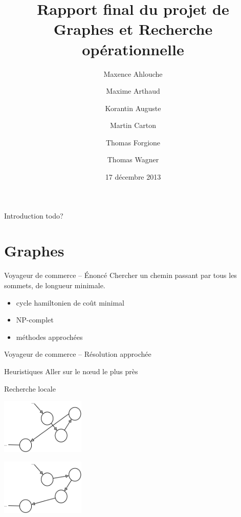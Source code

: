 \documentclass{beamer}
\title[Rapport final de GRO]
      {Rapport final du projet de\\Graphes et Recherche opérationnelle}
\institute{Enseeiht}
\author
  [Ahlouche \and Arthaud \and Auguste
    \and Carton \and Forgione \and Wagner]
  {Maxence Ahlouche \and Maxime Arthaud \and Korantin Auguste
    \and Martin Carton \and Thomas Forgione \and Thomas Wagner}
\date{17 décembre 2013}
\begin{document}
\begin{frame}
  \titlepage
\end{frame}

\begin{frame}{Introduction}
  todo?
\end{frame}

\section{Graphes}

\begin{frame}{Voyageur de commerce -- Énoncé}
    Chercher un chemin passant par tous les sommets, de longueur minimale.
    \begin{itemize}
        \item cycle hamiltonien de coût minimal
        \item NP-complet
        \item méthodes approchées
    \end{itemize}
\end{frame}

\begin{frame}{Voyageur de commerce -- Résolution approchée}
    \begin{block}{Heuristiques}
        Aller sur le nœud le plus près
    \end{block}

    \begin{block}{Recherche locale}
      \centering
      \begin{multicols}{2}
        \includegraphics[width=0.3\textwidth]{../rapport/graphes/2opt1.png}

        \includegraphics[width=0.3\textwidth]{../rapport/graphes/2opt2.png}
      \end{multicols}
    \end{block}
\end{frame}
\end{document}
